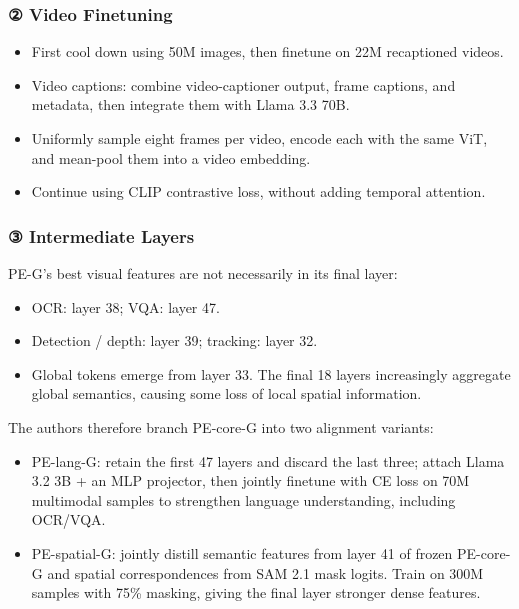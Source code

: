 \subsubsection{{②} Video Finetuning}
\begin{itemize}
\item First cool down using 50M images, then finetune on 22M recaptioned videos.\allowbreak{}
\item Video captions: combine video-\allowbreak{}captioner output, frame captions, and metadata, then integrate them with Llama 3.\allowbreak{}3 70B.\allowbreak{}
\item Uniformly sample eight frames per video, encode each with the same ViT, and mean-\allowbreak{}pool them into a video embedding.\allowbreak{}
\item Continue using CLIP contrastive loss, without adding temporal attention.\allowbreak{}
\end{itemize}
\subsubsection{{③} Intermediate Layers}
PE-\allowbreak{}G's best visual features are not necessarily in its final layer:\par
\begin{itemize}
\item OCR: layer 38; VQA: layer 47.\allowbreak{}
\item Detection /\allowbreak{} depth: layer 39; tracking: layer 32.\allowbreak{}
\item Global tokens emerge from layer 33.\allowbreak{} The final 18 layers increasingly aggregate global semantics, causing some loss of local spatial information.\allowbreak{}
\end{itemize}
The authors therefore branch PE-\allowbreak{}core-\allowbreak{}G into two alignment variants:\par
\begin{itemize}
\item PE-\allowbreak{}lang-\allowbreak{}G: retain the first 47 layers and discard the last three; attach Llama 3.\allowbreak{}2 3B + an MLP projector, then jointly finetune with CE loss on 70M multimodal samples to strengthen language understanding, including OCR/\allowbreak{}VQA.\allowbreak{}
\item PE-\allowbreak{}spatial-\allowbreak{}G: jointly distill semantic features from layer 41 of frozen PE-\allowbreak{}core-\allowbreak{}G and spatial correspondences from SAM 2.\allowbreak{}1 mask logits.\allowbreak{} Train on 300M samples with 75\% masking, giving the final layer stronger dense features.\allowbreak{}
\end{itemize}
\clearpage
{}
